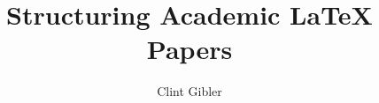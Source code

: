 \documentclass{article}
\begin{document}
\title{Structuring Academic LaTeX Papers}

\author{Clint Gibler}

\maketitle



\begin{abstract}

\end{abstract}








\renewcommand{\bibfont}{\normalfont\small}
\printbibliography
\end{document}
